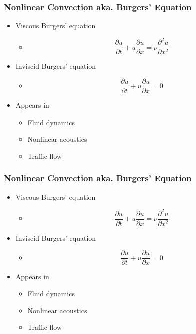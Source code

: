 \begin{frame}
  \frametitle{Nonlinear Convection aka. Burgers' Equation}
\begin{itemize}
  \item   Viscous Burgers' equation
  \begin{itemize}
    \item $$
    \frac {\partial u}{\partial t}+u{\frac {\partial u}{\partial x}}=\nu {\frac {\partial ^{2}u}{\partial x^{2}}}
    $$
  \end{itemize}
  \item Inviscid Burgers' equation
  \begin{itemize}
    \item $$
    \frac {\partial u}{\partial t}+u{\frac {\partial u}{\partial x}}=0
    $$
  \end{itemize}
  \item Appears in
  \begin{itemize}
    \item Fluid dynamics
    \item Nonlinear acoustics
    \item Traffic flow
  \end{itemize}
\end{itemize}
\end{frame}



\begin{frame}
  \frametitle{Nonlinear Convection aka. Burgers' Equation}
\begin{itemize}
  \item   Viscous Burgers' equation
  \begin{itemize}
    \item $$
    \frac {\partial u}{\partial t}+u{\frac {\partial u}{\partial x}}=\nu {\frac {\partial ^{2}u}{\partial x^{2}}}
    $$
  \end{itemize}
  \item Inviscid Burgers' equation
  \begin{itemize}
    \item $$
    \frac {\partial u}{\partial t}+u{\frac {\partial u}{\partial x}}=0
    $$
  \end{itemize}
  \item Appears in
  \begin{itemize}
    \item Fluid dynamics
    \item Nonlinear acoustics
    \item Traffic flow
  \end{itemize}
\end{itemize}
\end{frame}

